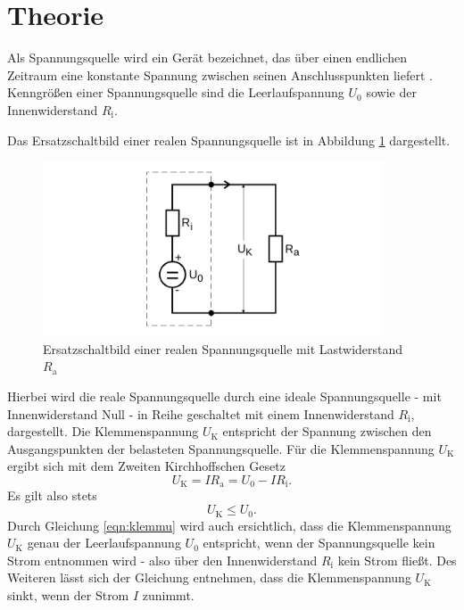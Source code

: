 \section{Theorie}
\label{sec:Theorie}

Als Spannungsquelle wird ein Gerät bezeichnet, das über einen endlichen Zeitraum eine konstante Spannung zwischen seinen Anschlusspunkten liefert \cite{Anleitung}.
Kenngrößen einer Spannungsquelle sind die Leerlaufspannung $U_0$ sowie der Innenwiderstand $R_{\text{i}}$.

Das Ersatzschaltbild einer realen Spannungsquelle ist in Abbildung \ref{fig:abbildung1} dargestellt.
\begin{figure}[H]
  \centering
  \includegraphics[width=0.9\textwidth]{Bilder/Abbildung1.png}
	\caption{Ersatzschaltbild einer realen Spannungsquelle mit Lastwiderstand $R_{\text{a}}$ \cite{Anleitung}}
  \label{fig:abbildung1}
\end{figure}
Hierbei wird die reale Spannungsquelle durch eine ideale Spannungsquelle - mit Innenwiderstand Null - in Reihe geschaltet mit einem Innenwiderstand $R_{\text{i}}$, dargestellt.
Die Klemmenspannung $U_{\text{K}}$ entspricht der Spannung zwischen den Ausgangspunkten der belasteten Spannungsquelle.
Für die Klemmenspannung $U_{\text{K}}$ ergibt sich mit dem Zweiten Kirchhoffschen Gesetz
\begin{equation}
	\label{eqn:klemmu}
	U_{\text{K}} = I R_{\text{a}} = U_0 - I R_{\text{i}} \text{.}
\end{equation}
Es gilt also stets
\begin{equation}
	U_{\text{K}} \le U_0 \text{.}
\end{equation}
Durch Gleichung \eqref{eqn:klemmu} wird auch ersichtlich, dass die Klemmenspannung $U_{\text{K}}$ genau der Leerlaufspannung $U_0$ entspricht, wenn der Spannungsquelle kein Strom entnommen wird - also über den Innenwiderstand $R_{\text{i}}$ kein Strom fließt. Des Weiteren lässt sich der Gleichung entnehmen, dass die Klemmenspannung $U_{\text{K}}$ sinkt, wenn der Strom $I$ zunimmt.

